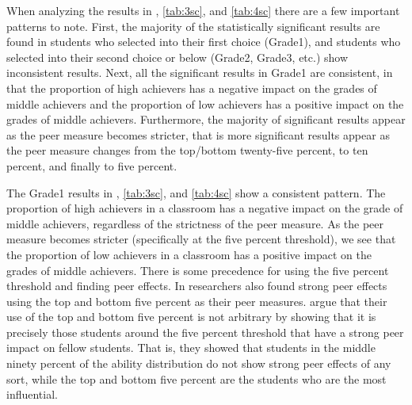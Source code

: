 \clearpage{}

When analyzing the results in , \ref{tab:3sc}, and \ref{tab:4sc} there are a few important patterns to note. 
First, the majority of the statistically significant results are found in students who selected into their first choice (Grade1), and students who selected into their second choice or below (Grade2, Grade3, etc.) show inconsistent results. 
Next, all the significant results in Grade1 are consistent, in that the proportion of high achievers has a negative impact on the grades of middle achievers and the proportion of low achievers has a positive impact on the grades of middle achievers. 
Furthermore, the majority of significant results appear as the peer measure becomes stricter, that is more significant results appear as the peer measure changes from the top/bottom twenty-five percent, to ten percent, and finally to five percent. 
 
The Grade1 results in , \ref{tab:3sc}, and \ref{tab:4sc} show a consistent pattern. 
The proportion of high achievers in a classroom has a negative impact on the grade of middle achievers, regardless of the strictness of the peer measure. 
As the peer measure becomes stricter (specifically at the five percent threshold), we see that the proportion of low achievers in a classroom has a positive impact on the grades of middle achievers. 
There is some precedence for using the five percent threshold and finding peer effects. 
In \citet{lavy2012good} researchers also found strong peer effects using the top and bottom five percent as their peer measures. 
\citet{lavy2012good} argue that their use of the top and bottom five percent is not arbitrary by showing that it is precisely those students around the five percent threshold that have a strong peer impact on fellow students. 
That is, they showed that students in the middle ninety percent of the ability distribution do not show strong peer effects of any sort, while the top and bottom five percent are the students who are the most influential. 

